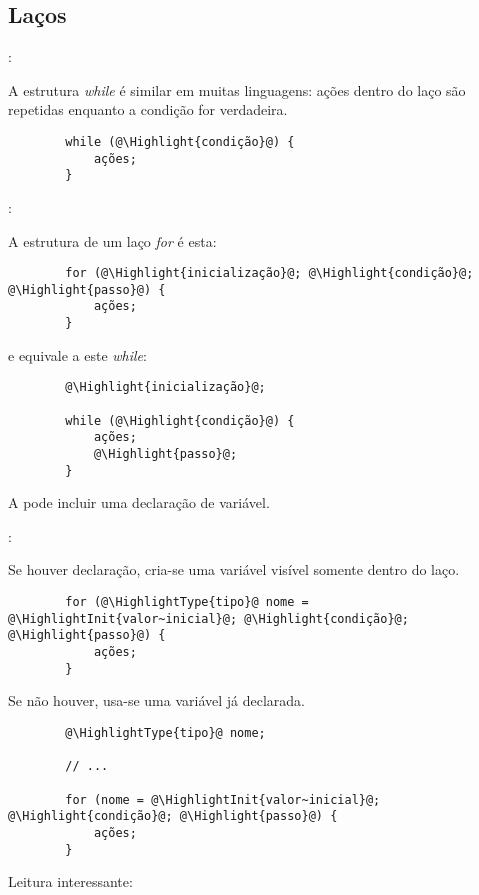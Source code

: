 \subsection{Laços}


\begin{frame}[fragile]{\insertsection: \insertsubsection}

	A estrutura \emph{while} é similar em muitas linguagens: ações dentro do laço são repetidas enquanto a condição for verdadeira.
	\begin{verbatim}
		while (@\Highlight{condição}@) {
			ações;
		}
	\end{verbatim}

\end{frame}


\begin{frame}[fragile]{\insertsection: \insertsubsection}

	A estrutura de um laço \emph{for} é esta:
	\begin{verbatim}
		for (@\Highlight{inicialização}@; @\Highlight{condição}@; @\Highlight{passo}@) {
			ações;
		}
	\end{verbatim}
	e equivale a este \emph{while}:
	\begin{verbatim}
		@\Highlight{inicialização}@;

		while (@\Highlight{condição}@) {
			ações;
			@\Highlight{passo}@;
		}
	\end{verbatim}

	A  pode incluir uma declaração de variável.

\end{frame}


\begin{frame}[b,fragile]{\insertsection: \insertsubsection}

	Se houver declaração, cria-se uma variável visível somente dentro do laço.
	\begin{verbatim}
		for (@\HighlightType{tipo}@ nome = @\HighlightInit{valor~inicial}@; @\Highlight{condição}@; @\Highlight{passo}@) {
			ações;
		}
	\end{verbatim}

	Se não houver, usa-se uma variável já declarada.
	\begin{verbatim}
		@\HighlightType{tipo}@ nome;

		// ...

		for (nome = @\HighlightInit{valor~inicial}@; @\Highlight{condição}@; @\Highlight{passo}@) {
			ações;
		}
	\end{verbatim}

	\vfill
	Leitura interessante: 

\end{frame}


